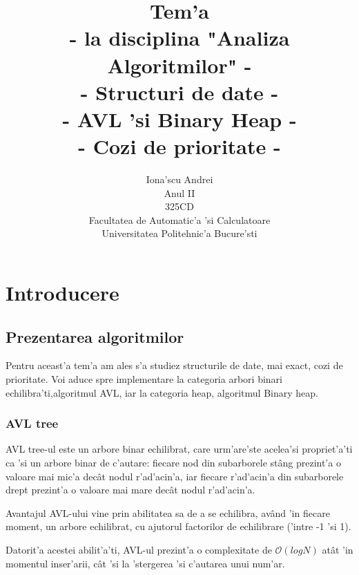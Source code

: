 \documentclass[titlepage,12pt]{article}
\numberwithin{figure}{section}
\begin{document}
\title{Tem'a\\
{\small - la disciplina "Analiza Algoritmilor" - \\
- Structuri de date - \\- AVL 'si Binary Heap - \\ - Cozi de prioritate -}}
\author{{ Iona'scu Andrei} \\ Anul II \\
 325CD \\ Facultatea de Automatic'a 'si Calculatoare \\ Universitatea Politehnic'a Bucure'sti}
\maketitle

\newpage
\tableofcontents

\newpage
\section{Introducere}
\subsection{Prezentarea algoritmilor} 
\par Pentru aceast'a tem'a am ales s'a studiez structurile de date, mai exact, cozi de prioritate.
Voi aduce spre implementare la categoria arbori binari echilibra'ti,algoritmul AVL, iar la categoria heap, algoritmul Binary heap. \par
\subsubsection{AVL tree}
	AVL tree-ul este un arbore binar echilibrat, care urm'are'ste acelea'si propriet'a'ti ca 'si un arbore binar de c'autare: fiecare nod din subarborele st\^ang prezint'a o valoare mai mic'a dec\^at nodul r'ad'acin'a, iar fiecare r'ad'acin'a din subarborele drept prezint'a o valoare mai mare dec\^at nodul r'ad'acin'a. 
	\par Avantajul AVL-ului vine prin abilitatea sa de a se echilibra, av\^and 'in fiecare moment, un arbore echilibrat, cu ajutorul factorilor de echilibrare ('intre -1 'si 1). 
	\par Datorit'a acestei abilit'a'ti, AVL-ul prezint'a o complexitate de \textbf{$\mathcal{O}(log N)$} at\^at 'in momentul inser'arii, c\^at 'si la 'stergerea 'si c'autarea unui num'ar. 
\end{document}
